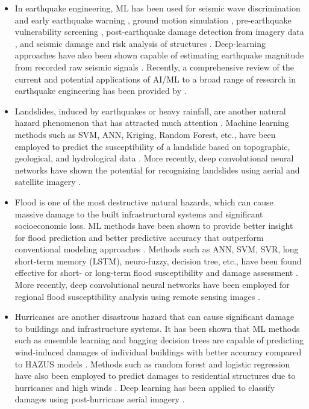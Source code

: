 \begin{itemize}
 \item In earthquake engineering, ML has been used for seismic wave discrimination and early earthquake warning \citep{li2018machine}, ground motion simulation \citep{alimoradi2015machinelearning}, pre-earthquake vulnerability screening \citep{yu2019building}, post-earthquake damage detection from imagery data \citep{cooner2016detection,bai2017machine}, and seismic damage and risk analysis of structures \citep{gidaris2015kriging}. Deep‐learning approaches have also been shown capable of estimating earthquake magnitude from recorded raw seismic signals \citep{mousavi2020machine}. Recently, a comprehensive review of the current and potential applications of AI/ML to a broad range of research in earthquake engineering has been provided by \citet{xie2020promise}. 
 \item Landslides, induced by earthquakes or heavy rainfall, are another natural hazard phenomenon that has attracted much attention \citep{dou2014gisbased}. Machine learning methods such as SVM, ANN, Kriging, Random Forest, etc., have been employed to predict the susceptibility of a landslide based on topographic, geological, and hydrological data \citep{yao2008landslide,goetz2015evaluating,pham2016comparative}. More recently, deep convolutional neural networks have shown the potential for recognizing landslides using aerial and satellite imagery \citep{ghorbanzadeh2019evaluation}.
 \item Flood is one of the most destructive natural hazards, which can cause massive damage to the built infrastructural systems and significant socioeconomic loss. ML methods have been shown to provide better insight for flood prediction and better predictive accuracy that outperform conventional modeling approaches \citep{abbot2014input,mosavi2018flood}. Methods such as ANN, SVM, SVR, long short-term memory (LSTM), neuro-fuzzy, decision tree, etc., have been found effective for short- or long-term flood susceptibility and damage assessment \citep{kim2016realtime,gizaw2016regional,resch2018combining,darabi2019urban,le2019application}. More recently, deep convolutional neural networks have been employed for regional flood susceptibility analysis using remote sensing images \citep{gebrehiwot2019deep,li2019urban,wang2020flood}. 
 \item Hurricanes are another disastrous hazard that can cause significant damage to buildings and infrastructure systems. It has been shown that ML methods such as ensemble learning and bagging decision trees are capable of predicting wind-induced damages of individual buildings with better accuracy compared to HAZUS models \citep{subramanian2013constructing}. Methods such as random forest and logistic regression have also been employed to predict damages to residential structures due to hurricanes and high winds \citep{salazar2015predicting}. Deep learning has been applied to classify damages using post-hurricane aerial imagery \citep{thomas2011robust,li2018semisupervised, kersbergen2018automated}. 
\end{itemize}

